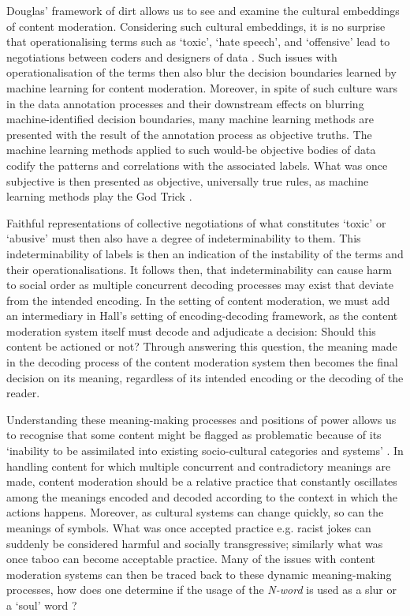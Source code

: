 Douglas' framework of dirt allows us to see and examine the cultural embeddings of content moderation. Considering such cultural embeddings, it is no surprise that operationalising terms such as `toxic', `hate speech', and `offensive' lead to negotiations between coders and designers of data \cite{Waseem:2016}. Such issues with operationalisation of the terms then also blur the decision boundaries learned by machine learning for content moderation. Moreover, in spite of such culture wars in the data annotation processes and their downstream effects on blurring machine-identified decision boundaries, many machine learning methods are presented with the result of the annotation process as objective truths. The machine learning methods applied to such would-be objective bodies of data codify the patterns and correlations with the associated labels. What was once subjective is then presented as objective, universally true rules, as machine learning methods play the God Trick \citep{Haraway:1988}.\vspace{5mm}

Faithful representations of collective negotiations of what constitutes `toxic' or `abusive' must then also have a degree of indeterminability to them. This indeterminability of labels is then an indication of the instability of the terms and their operationalisations. It follows then, that indeterminability can cause harm to social order \cite{Hall:1997} as multiple concurrent decoding processes may exist that deviate from the intended encoding. In the setting of content moderation, we must add an intermediary in Hall's \cite{Hall:1997} setting of encoding-decoding framework, as the content moderation system itself must decode and adjudicate a decision: Should this content be actioned or not? Through answering this question, the meaning made in the decoding process of the content moderation system then becomes the final decision on its meaning, regardless of its intended encoding or the decoding of the reader.

Understanding these meaning-making processes and positions of power allows us to recognise that some content might be flagged as problematic because of its `inability to be assimilated into existing socio-cultural categories and systems' \cite{Rafi:2015}. In handling content for which multiple concurrent and contradictory meanings are made, content moderation should be a relative practice that constantly oscillates among the meanings encoded and decoded according to the context in which the actions happens. Moreover, as cultural systems can change quickly, so can the meanings of symbols. What was once accepted practice e.g. racist jokes can suddenly be considered harmful and socially transgressive; similarly what was once taboo can become acceptable practice.
Many of the issues with content moderation systems can then be traced back to these dynamic meaning-making processes, how does one determine if the usage of the \textit{N-word} is used as a slur or a `soul' word \cite{Rahman:2012}?\vspace{5mm}

